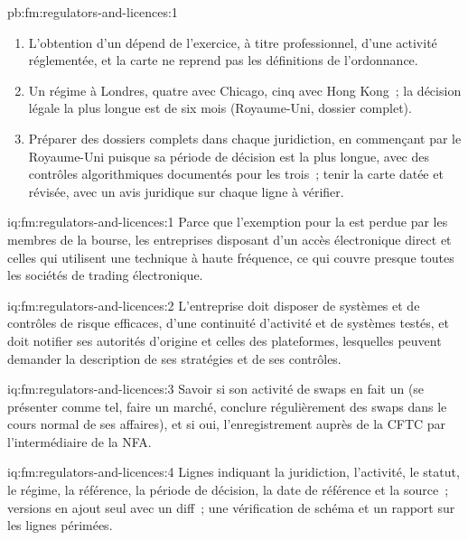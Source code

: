 \begin{solution}{pb:fm:regulators-and-licences:1}
\begin{enumerate}
\item L'obtention d'un  dépend de l'exercice, à titre professionnel, d'une activité réglementée, et la carte ne reprend pas les définitions de l'ordonnance.
\item Un régime à Londres, quatre avec Chicago, cinq avec Hong Kong~; la décision légale la plus longue est de six mois (Royaume-Uni, dossier complet).
\item Préparer des dossiers complets dans chaque juridiction, en commençant par le Royaume-Uni puisque sa période de décision est la plus longue, avec des contrôles algorithmiques documentés pour
les trois~; tenir la carte datée et révisée, avec un avis juridique sur chaque ligne à vérifier.
\end{enumerate}
\end{solution}

\begin{solution}{iq:fm:regulators-and-licences:1}
Parce que l'exemption pour la  est perdue par les membres de la bourse, les entreprises disposant d'un accès électronique direct et celles qui utilisent une technique à haute
fréquence, ce qui couvre presque toutes les sociétés de trading électronique.
\end{solution}

\begin{solution}{iq:fm:regulators-and-licences:2}
L'entreprise doit disposer de systèmes et de contrôles de risque efficaces, d'une continuité d'activité et de systèmes testés, et doit notifier ses autorités d'origine et celles des plateformes,
lesquelles peuvent demander la description de ses stratégies et de ses contrôles.
\end{solution}

\begin{solution}{iq:fm:regulators-and-licences:3}
Savoir si son activité de swaps en fait un  (se présenter comme tel, faire un marché, conclure régulièrement des swaps dans le cours normal de ses affaires), et
si oui, l'enregistrement auprès de la CFTC par l'intermédiaire de la NFA.
\end{solution}

\begin{solution}{iq:fm:regulators-and-licences:4}
Lignes indiquant la juridiction, l'activité, le statut, le régime, la référence, la période de décision, la date de référence et la source~; versions en ajout seul avec un diff~; une vérification de schéma
et un rapport sur les lignes périmées.
\end{solution}

